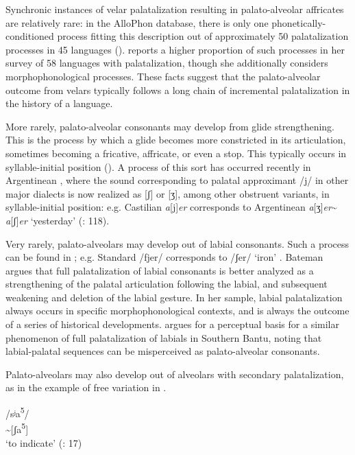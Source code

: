   Synchronic instances of velar palatalization resulting in palato-alveolar affricates are relatively rare: in the AlloPhon database, there is only one phonet\-ic\-al\-ly-conditioned process fitting this description out of approximately 50 palatalization processes in 45 languages (\citealt{BybeeEasterday2019}). \citet{Bateman2007} reports a higher proportion of such processes in her survey of 58 languages with palatalization, though she additionally considers morphophonological processes. These facts suggest that the palato-alveolar outcome from velars typically follows a long chain of incremental palatalization in the history of a language.

  More rarely, palato-alveolar consonants may develop from glide strengthening. This is the process by which a glide becomes more constricted in its articulation, sometimes becoming a fricative, affricate, or even a stop. This typically occurs in syllable-initial position (\citealt{BybeeEasterday2019}). A process of this sort has occurred recently in Argentinean , where the sound corresponding to palatal approximant /j/ in other major dialects is now realized as [ʃ] or [ʒ], among other obstruent variants, in syllable-initial position: e.g. Castilian  \textit{a}[j]\textit{er} corresponds to Argentinean  \textit{a}[ʒ]\textit{er}{\textasciitilde} \textit{a}[ʃ]\textit{er} ‘yesterday’ (\citealt{HarrisKaisse1999}: 118).

  Very rarely, palato-alveolars may develop out of labial consonants. Such a process can be found in ; e.g. Standard  /fjer/ corresponds to  /ʃer/ ‘iron’ \citep[108]{Bateman2007}. Bateman argues that full palatalization of labial consonants is better analyzed as a strengthening of the palatal articulation following the labial, and subsequent weakening and deletion of the labial gesture. In her sample, labial palatalization always occurs in specific morphophonological contexts, and is always the outcome of a series of historical developments. \citet{Ohala1978} argues for a perceptual basis for a similar phenomenon of full palatalization of labials in Southern Bantu, noting that labial-palatal sequences can be misperceived as palato-alveolar consonants.

  Palato-alveolars may also develop out of alveolars with secondary palatalization, as in the example of free variation in  .

\ea\label{ex:4.38}
\gll /sʲa\textsuperscript{5}/\\
[sʲa\textsuperscript{5}]{\textasciitilde}[ʃa\textsuperscript{5}]\\
\glt ‘to indicate’ (\citealt{BearthZemp1967}: 17)
\z

